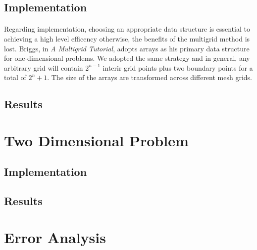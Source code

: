 \documentclass[pdftex,12pt,a4paper]{article}
\begin{document}
    \subsection{Implementation}   

        \paragraph*{} Regarding implementation, choosing an appropriate data structure is essential to achieving a high level efficency otherwise, the benefits of the multigrid method is lost.  Briggs, in \textit{A Multigrid Tutorial}, adopts arrays as his primary data structure for one-dimensional problems.  We adopted the same strategy and in general, any arbitrary grid will contain $2^{n-1}$ interir grid points plus two boundary points for a total of $2^{n}+1$.  The size of the arrays are transformed across different mesh grids.  

    \subsection{Results}
        \paragraph*{}

\section{Two Dimensional Problem}
    
    \subsection{Implementation}   
        \paragraph*{}

    \subsection{Results}
        \paragraph*{}

\section{Error Analysis}
    
\end{document}
